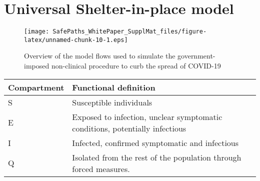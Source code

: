 \documentclass[]{article}
\begin{document}
\newpage

\hypertarget{universal-shelter-in-place-model}{%
\section{Universal Shelter-in-place
model}\label{universal-shelter-in-place-model}}

\begin{figure}
\centering
\texttt{[image: SafePaths\_WhitePaper\_SupplMat\_files/figure-latex/unnamed-chunk-10-1.eps]}
\caption{Overview of the model flows used to simulate the
government-imposed non-clinical procedure to curb the spread of
COVID-19}
\end{figure}

\begin{longtable}[]{@{}ll@{}}
\toprule
\begin{minipage}[b]{0.11\columnwidth}\raggedright
Compartment\strut
\end{minipage} & \begin{minipage}[b]{0.83\columnwidth}\raggedright
Functional definition\strut
\end{minipage}\tabularnewline
\midrule
\endhead
\begin{minipage}[t]{0.11\columnwidth}\raggedright
S\strut
\end{minipage} & \begin{minipage}[t]{0.83\columnwidth}\raggedright
Susceptible individuals\strut
\end{minipage}\tabularnewline
\begin{minipage}[t]{0.11\columnwidth}\raggedright
E\strut
\end{minipage} & \begin{minipage}[t]{0.83\columnwidth}\raggedright
Exposed to infection, unclear symptomatic conditions, potentially
infectious\strut
\end{minipage}\tabularnewline
\begin{minipage}[t]{0.11\columnwidth}\raggedright
I\strut
\end{minipage} & \begin{minipage}[t]{0.83\columnwidth}\raggedright
Infected, confirmed symptomatic and infectious\strut
\end{minipage}\tabularnewline
\begin{minipage}[t]{0.11\columnwidth}\raggedright
Q\strut
\end{minipage} & \begin{minipage}[t]{0.83\columnwidth}\raggedright
Isolated from the rest of the population through forced measures.

\end{minipage}
\end{longtable}
\end{document}
